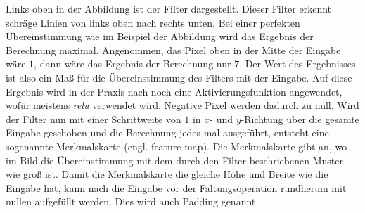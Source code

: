 Links oben in der Abbildung ist der Filter dargestellt.
Dieser Filter erkennt schräge Linien von links oben nach rechts unten.
Bei einer perfekten Übereinstimmung wie im Beispiel der Abbildung wird das Ergebnis der Berechnung maximal.
Angenommen, das Pixel oben in der Mitte der Eingabe wäre $1$, dann wäre das Ergebnis der Berechnung nur $7$.
Der Wert des Ergebnisses ist also ein Maß für die Übereinstimmung des Filters mit der Eingabe.
Auf diese Ergebnis wird in der Praxis nach \cite{6S191CNN} noch eine Aktivierungsfunktion angewendet, wofür meistens \emph{\acrshort{relu}} verwendet wird.
Negative Pixel werden dadurch zu null.
Wird der Filter nun mit einer Schrittweite von $1$ in $x$- und $y$-Richtung über die gesamte Eingabe geschoben und die Berechnung jedes mal ausgeführt, entsteht eine sogenannte Merkmalskarte (engl. feature map).
Die Merkmalskarte gibt an, wo im Bild die Übereinstimmung mit dem durch den Filter beschriebenen Muster wie groß ist.
Damit die Merkmalskarte die gleiche Höhe und Breite wie die Eingabe hat, kann nach \cite[S. 168 f.]{DeepLearningPythonKeras} die Eingabe vor der Faltungsoperation rundherum mit nullen aufgefüllt werden.
Dies wird auch Padding genannt.



